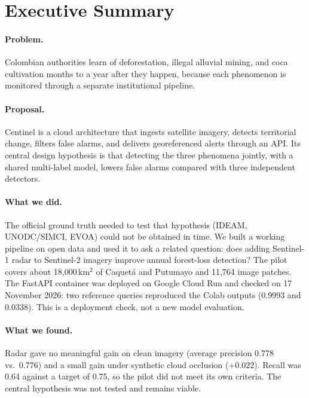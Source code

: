 \documentclass{article}
\begin{document}
\newpage

\section*{Executive Summary}

\paragraph{Problem.}
Colombian authorities learn of deforestation, illegal alluvial mining, and coca
cultivation months to a year after they happen, because each phenomenon is
monitored through a separate institutional pipeline.

\paragraph{Proposal.}
Centinel is a cloud architecture that ingests satellite imagery, detects
territorial change, filters false alarms, and delivers georeferenced alerts
through an API. Its central design hypothesis is that detecting the three
phenomena jointly, with a shared multi-label model, lowers false alarms
compared with three independent detectors.

\paragraph{What we did.}
The official ground truth needed to test that hypothesis (IDEAM, UNODC/SIMCI,
EVOA) could not be obtained in time. We built a working pipeline on open data
and used it to ask a related question: does adding Sentinel-1 radar to
Sentinel-2 imagery improve annual forest-loss detection? The pilot covers
about 18{,}000\,km$^2$ of Caquet\'a and Putumayo and 11{,}764 image patches. The FastAPI container was deployed on Google Cloud Run and checked on 17 November 2026: two reference queries reproduced the Colab outputs (0.9993 and 0.0338). This is a deployment check, not a new model evaluation.

\paragraph{What we found.}
Radar gave no meaningful gain on clean imagery (average precision 0.778 vs.\
0.776) and a small gain under synthetic cloud occlusion (+0.022). Recall was
0.64 against a target of 0.75, so the pilot did not meet its own criteria.
The central hypothesis was not tested and remains viable.
\end{document}
